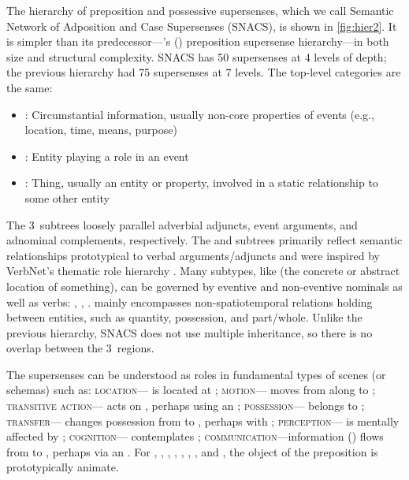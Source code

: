 \pdfoutput=1 \documentclass[11pt,a4paper]{article}
\newcommand{\citeposs}[2][]{\citeauthor{#2}'s (\citeyear[#1]{#2})}
\begin{document}
The hierarchy of preposition and possessive supersenses, which we call Semantic Network of Adposition and Case Supersenses (SNACS), is shown in \cref{fig:hier2}. It is simpler than its predecessor---\citeposs{schneider-16} preposition supersense hierarchy---in both size and structural complexity. SNACS has 50 supersenses at 4 levels of depth; the previous hierarchy had 75 supersenses at 7 levels. The top-level categories are the same:
\begin{itemize}
\item {}: Circumstantial information, usually non-core properties of events (e.g., location, time, means, purpose)
\item {}: Entity playing a role in an event 
\item {}: Thing, usually an entity or property, involved in a static relationship to some other entity
\end{itemize}
The 3~subtrees loosely parallel adverbial adjuncts, event arguments, and adnominal complements, respectively. The  and  subtrees primarily reflect semantic relationships prototypical to verbal arguments/adjuncts and were inspired by VerbNet's thematic role hierarchy \citep{palmer-17,bonial-11}. Many  subtypes, like  (the concrete or abstract location of something), 
can be governed by eventive and non-eventive nominals as well as verbs: , , .  mainly encompasses non-spatiotemporal relations holding between entities, such as quantity, possession, and part\slash whole. Unlike the previous hierarchy, SNACS does not use multiple inheritance, so there is no overlap between the 3~regions.

The supersenses can be understood as roles in fundamental types of scenes (or schemas) such as: \textsc{location}--- is located at ; \textsc{motion}--- moves from  along  to ; \textsc{transitive action}--- acts on , perhaps using an ; \textsc{possession}--- belongs to ; \textsc{transfer}--- changes possession from  to , perhaps with ; \textsc{perception}--- is mentally affected by ; \textsc{cognition}--- contemplates ; \textsc{communication}---information () flows from  to , perhaps via an .
For , , , , , , , and , the object of the preposition is prototypically animate.
\end{document}

